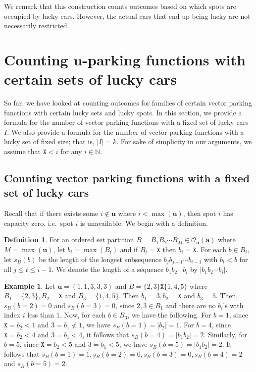 \documentclass[reqno]{amsart}
\newcommand{\X}{\texttt{X}}
\theoremstyle{definition}
\newtheorem{example}[theorem]{Example}
\newtheorem{definition}[theorem]{Definition}
\theoremstyle{remark}
\newcommand{\out}{\mathcal{O}}
\newcommand{\bsy}{\boldsymbol}
\begin{document}
We remark that this construction counts outcomes based on which spots are occupied by lucky cars. However, the actual cars that end up being lucky are not necessarily restricted. 




\section{Counting $\bsy{u}$-parking functions with certain sets of lucky cars}\label{sec:uparkingfunctions}
So far, we have looked at counting outcomes for families of certain vector parking functions {with certain lucky sets and lucky spots}. 
In this section, we provide a formula for the number of vector parking functions with a fixed set of lucky cars $I$. We also provide a formula for the number of vector parking functions with a lucky set of fixed size; that is, $|I|=k$. For sake of simplicity in our arguments, we assume that $\X<i$ for any $i\in \mathbb{N}$. 

\subsection{Counting vector parking functions with a fixed set of lucky cars}

Recall that if there exists some $i \notin \bsy{u}$ where $i<\max(\bsy{u})$, then spot $i$ has capacity zero, i.e.\ spot $i$ is unavailable. We begin with a definition.


\begin{definition}
For an ordered set partition $B=B_1B_2\cdots B_M\in \out_{\bsy{u}}(\bsy{a})$ where $M=\max(\bsy{u})$, let $b_i=\max(B_i)$ and if $B_i=\X$ then $b_i=\X$. For each $b\in B_i$, let $s_B(b)$ be the length of the longest subsequence $b_jb_{j+1}\cdots b_{i-1}$ with $b_t<b$  for all $j\leq t\leq i-1$. We denote the length of a sequence $b_1b_{2}\cdots b_{i}$ by $|b_1b_{2}\cdots b_{i}|$.

\end{definition}



\begin{example}\label{ex:outcome2}
Let $\bsy{u}=(1,1,3,3,3)$ and $B=\{2,3\}\X\{1,4,5\}$ where $B_1=\{2,3\}, B_2=\X$ and $B_3=\{1,4,5\}$. Then $b_1=3, b_2=\X$ and $b_3=5$. Then, $s_B(b=2)=0$ and $s_B(b=3)=0$, since $2,3 \in B_1$ and there are no $b_i$'s with index $i$ less than $1$. Now, for each $b\in B_3$, we have the following. For $b=1$, since $\X=b_2<1$ and $3=b_1\nless 1$, we have $s_B(b=1)=|b_2|=1$. For $b=4$, since $\X=b_2<4$ and $3=b_1<4$, it follows that $s_B(b=4)=|b_1b_2|=2$. Similarly, for $b=5$, since $\X=b_2<5$ and $3=b_1<5$, we have $s_B(b=5)=|b_1b_2|=2$. It follows that $s_B(b=1)=1, s_B(b=2)=0, s_B(b=3)=0,  s_B(b=4)=2$ and $s_B(b=5)=2$.
\end{example}
\end{document}
